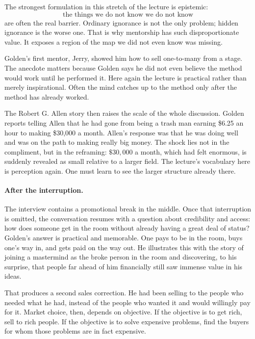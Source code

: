 The strongest formulation in this stretch of the lecture is epistemic:
\begin{equation}
\text{the things we do not know we do not know}
\end{equation}
are often the real barrier. Ordinary ignorance is not the only problem; hidden ignorance is the worse one. That is why mentorship has such disproportionate value. It exposes a region of the map we did not even know was missing.

Golden's first mentor, Jerry, showed him how to sell one-to-many from a stage. The anecdote matters because Golden says he did not even believe the method would work until he performed it. Here again the lecture is practical rather than merely inspirational. Often the mind catches up to the method only after the method has already worked.

The Robert G. Allen story then raises the scale of the whole discussion. Golden reports telling Allen that he had gone from being a trash man earning \$6.25 an hour to making \$30,000 a month. Allen's response was that he was doing well and was on the path to making really big money. The shock lies not in the compliment, but in the reframing: \( \$30{,}000 \) a month, which had felt enormous, is suddenly revealed as small relative to a larger field. The lecture's vocabulary here is perception again. One must learn to see the larger structure already there.

\paragraph{After the interruption.}
The interview contains a promotional break in the middle. Once that interruption is omitted, the conversation resumes with a question about credibility and access: how does someone get in the room without already having a great deal of status? Golden's answer is practical and memorable. One pays to be in the room, buys one's way in, and gets paid on the way out. He illustrates this with the story of joining a mastermind as the broke person in the room and discovering, to his surprise, that people far ahead of him financially still saw immense value in his ideas.

That produces a second sales correction. He had been selling to the people who needed what he had, instead of the people who wanted it and would willingly pay for it. Market choice, then, depends on objective. If the objective is to get rich, sell to rich people. If the objective is to solve expensive problems, find the buyers for whom those problems are in fact expensive.

